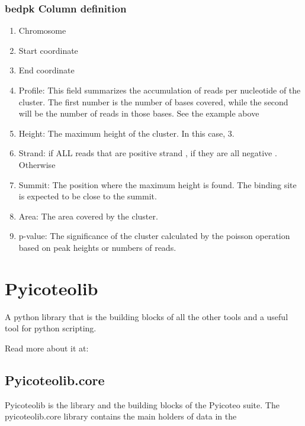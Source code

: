 \documentclass[letterpaper,10pt,english]{sphinxmanual}
\begin{document}
\subsection{bedpk Column definition}
\label{index:bedpk-column-definition}\begin{enumerate}
\item {} 
Chromosome

\item {} 
Start coordinate

\item {} 
End coordinate

\item {} 
Profile: This field summarizes the accumulation of reads per nucleotide of the cluster. The first number is the number of bases covered, while the second will be the number of reads in those bases. See the example above

\item {} 
Height: The maximum height of the cluster. In this case, 3.

\item {} 
Strand: if ALL reads that  are positive strand \code{+}, if they are all negative \code{-}. Otherwise 

\item {} 
Summit: The position where the maximum height is found. The binding site is expected to be close to the summit.

\item {} 
Area: The area covered by the cluster.

\item {} 
p-value: The significance of the cluster calculated by the poisson operation based on peak heights or numbers of reads.

\end{enumerate}


\chapter{Pyicoteolib}
\label{index:pyicoteolib}
A python library that is the building blocks of all the other tools and a useful tool for python scripting.

Read more about it at:


\section{Pyicoteolib.core}
\label{pyicoteolib:pyicoteolib-core}\label{pyicoteolib::doc}\label{pyicoteolib:libdocs}
Pyicoteolib is the library and the building blocks of the Pyicoteo suite. The pyicoteolib.core library contains the main holders of data in the
\end{document}
